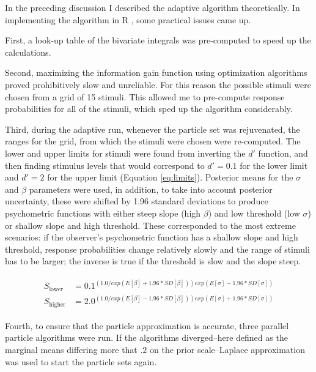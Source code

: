 \documentclass{article}\usepackage{knitr}
\begin{document}
In the preceding discussion I described the adaptive algorithm theoretically. In implementing the algorithm in R \citep{r_language}, some practical issues came up. 

First, a look-up table of the bivariate integrals was pre-computed to speed up the calculations. 

Second, maximizing the information gain function using optimization algorithms proved prohibitively slow and unreliable. For this reason the possible stimuli were chosen from a grid of 15 stimuli. This allowed me to pre-compute response probabilities for all of the stimuli, which sped up the algorithm considerably. 

Third, during the adaptive run, whenever the particle set was rejuvenated, the ranges for the grid, from which the stimuli were chosen were re-computed. The lower and upper limits for stimuli were found from inverting the $d'$ function, and then finding stimulus levels that would correspond to $d' = 0.1$ for the lower limit and $d' = 2$ for the upper limit (Equation \ref{eq:limits}). Posterior means for the $\sigma$ and $\beta$ parameters were used, in addition, to take into account posterior uncertainty, these were shifted by 1.96 standard deviations to produce psychometric functions with either steep slope (high $\beta$) and low threshold (low $\sigma$) or shallow slope and high threshold. These corresponded to the most extreme scenarios: if the observer's psychometric function has a shallow slope and high threshold, response probabilities change relatively slowly and the range of stimuli has to be larger; the inverse is true if the threshold is slow and the slope steep. 

\begin{align}
\begin{split}
\label{eq:limits}
S_{\text{lower}} &= 0.1^{(1.0 / exp(E[\beta] + 1.96 * SD[\beta])) exp(E[\sigma] - 1.96 * SD[\sigma])}
\\ 
S_{\text{higher}} &= 2.0^ {(1.0 / exp(E[\beta] - 1.96 * SD[\beta])) exp(E[\sigma] + 1.96 * SD[\sigma])}
\end{split}
\end{align}

Fourth, to ensure that the particle approximation is accurate, three parallel particle algorithms were run. If the algorithms diverged--here defined as the marginal means differing more that $.2$ on the prior scale--Laplace approximation was used to start the particle sets again.

\newpage
\end{document}
